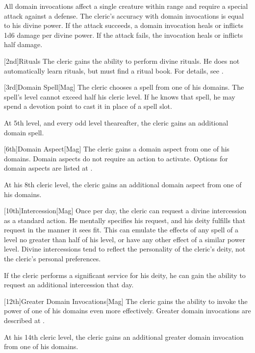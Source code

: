         All domain invocations affect a single creature within \rngmed range and require a special attack against a defense.
        The cleric's accuracy with domain invocations is equal to his divine power.
        If the attack succeeds, a domain invocation heals or inflicts 1d6 damage per divine power.
        If the attack fails, the invocation heals or inflicts half damage.

        [2nd]{Rituals}
        The cleric gains the ability to perform divine rituals.
        He does not automatically learn rituals, but must find a ritual book.
        For details, see .

        [3rd]{Domain Spell}[Mag]
        The cleric chooses a spell from one of his domains.
        The spell's level cannot exceed half his cleric level.
        If he knows that spell, he may spend a devotion point to cast it in place of a spell slot.

        At 5th level, and every odd level theareafter, the cleric gains an additional domain spell.

        [6th]{Domain Aspect}[Mag]
        The cleric gains a domain aspect from one of his domains.
        Domain aspects do not require an action to activate.
        Options for domain aspects are listed at .

        At his 8th cleric level, the cleric gains an additional domain aspect from one of his domains.

        [10th]{Intercession}[Mag]
        Once per day, the cleric can request a divine intercession as a standard action.
        He mentally specifies his request, and his deity fulfills that request in the manner it sees fit.
        This can emulate the effects of any spell of a level no greater than half of his level, or have any other effect of a similar power level.
        Divine intercessions tend to reflect the personality of the cleric's deity, not the cleric's personal preferences.

        If the cleric performs a significant service for his deity, he can gain the ability to request an additional intercession that day.

        [12th]{Greater Domain Invocations}[Mag]
        The cleric gains the ability to invoke the power of one of his domains even more effectively.
        Greater domain invocations are described at .

        At his 14th cleric level, the cleric gains an additional greater domain invocation from one of his domains.

